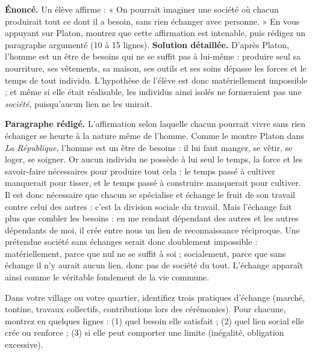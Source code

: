 \documentclass[11pt]{article}
\begin{document}
\begin{exoresolu}
\textbf{Énoncé.} Un élève affirme : « On pourrait imaginer une société où chacun produirait tout ce dont il a besoin, sans rien échanger avec personne. » En vous appuyant sur Platon, montrez que cette affirmation est intenable, puis rédigez un paragraphe argumenté (10 à 15 lignes).
\tcblower
\textbf{Solution détaillée.} D'après Platon, l'homme est un être de besoins qui ne se suffit pas à lui-même : produire seul sa nourriture, ses vêtements, sa maison, ses outils et ses soins dépasse les forces et le temps de tout individu. L'hypothèse de l'élève est donc matériellement impossible ; et même si elle était réalisable, les individus ainsi isolés ne formeraient pas une \emph{société}, puisqu'aucun lien ne les unirait.
\par\textbf{Paragraphe rédigé.} L'affirmation selon laquelle chacun pourrait vivre sans rien échanger se heurte à la nature même de l'homme. Comme le montre Platon dans \emph{La République}, l'homme est un être de besoins : il lui faut manger, se vêtir, se loger, se soigner. Or aucun individu ne possède à lui seul le temps, la force et les savoir-faire nécessaires pour produire tout cela : le temps passé à cultiver manquerait pour tisser, et le temps passé à construire manquerait pour cultiver. Il est donc nécessaire que chacun se spécialise et échange le fruit de son travail contre celui des autres : c'est la division sociale du travail. Mais l'échange fait plus que combler les besoins : en me rendant dépendant des autres et les autres dépendants de moi, il crée entre nous un lien de reconnaissance réciproque. Une prétendue société sans échanges serait donc doublement impossible : matériellement, parce que nul ne se suffit à soi ; socialement, parce que sans échange il n'y aurait aucun lien, donc pas de société du tout. L'échange apparaît ainsi comme le véritable fondement de la vie commune.
\end{exoresolu}

\begin{exercice}
Dans votre village ou votre quartier, identifiez trois pratiques d'échange (marché, tontine, travaux collectifs, contributions lors des cérémonies). Pour chacune, montrez en quelques lignes : (1) quel besoin elle satisfait ; (2) quel lien social elle crée ou renforce ; (3) si elle peut comporter une limite (inégalité, obligation excessive).
\end{exercice}
\end{document}
